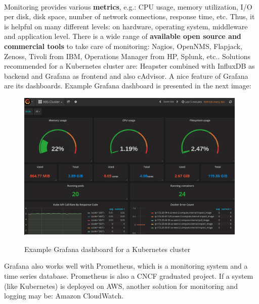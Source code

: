 \paragraph{}
Monitoring provides various \textbf{metrics}, e.g.: CPU usage, memory utilization, I/O per disk, disk space, number of network connections, response time, etc. Thus, it is helpful on many different levels: on hardware, operating system,  middleware and application level. There is a wide range of \textbf{available open source and commercial tools} to take care of monitoring: Nagios, OpenNMS, Flapjack, Zenoss, Tivoli from IBM, Operations Manager from HP, Splunk, etc.\cite{book-cicd}. Solutions recommended for a Kubernetes cluster are: Heapster combined with InfluxDB as backend and Grafana as frontend and also cAdvisor\cite{book-mastering-k8s}. A nice feature of Grafana are its dashboards. Example Grafana dashboard is presented in the next image:
\begin{figure}[H]
  \centering
  \includegraphics[width=11cm]{figures/grafana.png}
  \label{fig:grafana}
  \caption{Example Grafana dashboard for a Kubernetes cluster\cite{monitor-kubernetes-cluster-prometheus-grafana}}
\end{figure}
Grafana also works well with Prometheus, which is a monitoring system and a time series database. Prometheus is also a CNCF graduated project\cite{online-prometheus-gh}\cite{online-prometheus-www}. If a system (like Kubernetes) is deployed on AWS, another solution for monitoring and logging may be: Amazon CloudWatch\cite{online-cw}.

